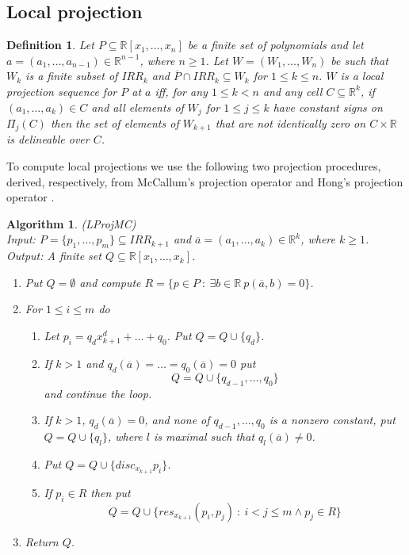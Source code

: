 \documentclass[english]{amsart}
\numberwithin{equation}{section}
\numberwithin{figure}{section}
\newtheorem{defn}[thm]{Definition}
\newtheorem{algorithm}[thm]{Algorithm}
\begin{document}
\subsection{Local projection}
\begin{defn}
Let $P\subseteq\mathbb{R}[x_{1},\ldots,x_{n}]$ be a finite set of
polynomials and let $a=(a_{1},\ldots,a_{n-1})\in\mathbb{R}^{n-1}$,
where $n\geq1$. Let $W=(W_{1},\ldots,W_{n})$ be such that $W_{k}$
is a finite subset of $IRR_{k}$ and $\overline{P}\cap IRR_{k}\subseteq W_{k}$
for $1\leq k\leq n$. $W$ is a \emph{local projection sequence} for
$P$ at $a$ iff, for any $1\leq k<n$ and any cell $C\subseteq\mathbb{R}^{k}$,
if $(a_{1},\ldots,a_{k})\in C$ and all elements of $W_{j}$ for $1\leq j\leq k$
have constant signs on $\Pi_{j}(C)$ then the set of elements of $W_{k+1}$
that are not identically zero on $C\times\mathbb{R}$ is delineable
over $C$. 
\end{defn}
To compute local projections we use the following two projection procedures,
derived, respectively, from McCallum's projection operator \cite{MC1,MC2,B}
and Hong's projection operator \cite{H}.
\begin{algorithm}
\label{alg:LProjMC}(LProjMC)\\
Input:\emph{ }$P=\{p_{1},\ldots,p_{m}\}\subseteq IRR_{k+1}$ \emph{and
}$\overline{a}=(a_{1},\ldots,a_{k})\in\mathbb{R}^{k}$\emph{, where
$k\geq1$.}\textup{}\\
\textup{\emph{Output:}}\textup{ A }\emph{finite set }$Q\subseteq\mathbb{R}[x_{1},\ldots,x_{k}]$.
\begin{enumerate}
\item Put $Q=\emptyset$ and compute $R=\{p\in P\::\:\exists b\in\mathbb{R}\: p(\overline{a},b)=0\}$.
\item For $1\leq i\leq m$ do

\begin{enumerate}
\item Let $p_{i}=q_{d}x_{k+1}^{d}+\ldots+q_{0}$. Put $Q=Q\cup\{q_{d}\}$.
\item If $k>1$ and $q_{d}(\overline{a})=\ldots=q_{0}(\overline{a})=0$
put \[
Q=Q\cup\{q_{d-1},\ldots,q_{0}\}\]
 and continue the loop.
\item If $k>1$, $q_{d}(\overline{a})=0$, and none of $q_{d-1},\ldots,q_{0}$
is a nonzero constant, put $Q=Q\cup\{q_{l}\}$, where $l$ is maximal
such that $q_{l}(\overline{a})\neq0$.
\item Put $Q=Q\cup\{disc_{x_{k+1}}p_{i}\}$.
\item If $p_{i}\in R$ then put \[
Q=Q\cup\{res_{x_{k+1}}(p_{i},p_{j})\::\: i<j\leq m\wedge p_{j}\in R\}\]

\end{enumerate}
\item Return $Q$.
\end{enumerate}
\end{algorithm}
\end{document}
